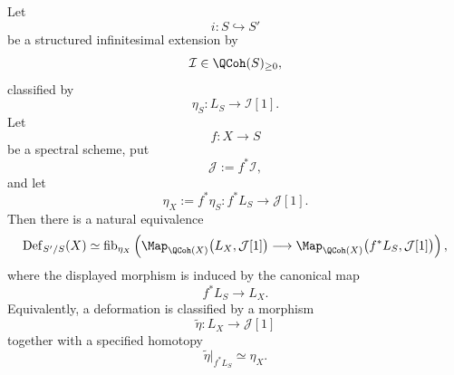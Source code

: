 \begin{lemma}
\label{lem:global-deformation-fixed-topos}
Let
\[
    i
    \colon
    S
    \hookrightarrow
    S'
\]
be a structured infinitesimal extension by
\[
    \mathcal I
    \in
    \QCoh(S)_{\geq0},
\]
classified by
\[
    \eta_S
    \colon
    L_S
    \longrightarrow
    \mathcal I[1].
\]
Let
\[
    f
    \colon
    X
    \longrightarrow
    S
\]
be a spectral scheme, put
\[
    \mathcal J
    :=
    f^*\mathcal I,
\]
and let
\[
    \eta_X
    :=
    f^*\eta_S
    \colon
    f^*L_S
    \longrightarrow
    \mathcal J[1].
\]
Then there is a natural equivalence
\[
    \operatorname{Def}_{S'/S}(X)
    \simeq
    \operatorname{fib}_{\eta_X}
    \left(
        \Map_{\QCoh(X)}
        \bigl(
            L_X,
            \mathcal J[1]
        \bigr)
        \longrightarrow
        \Map_{\QCoh(X)}
        \bigl(
            f^*L_S,
            \mathcal J[1]
        \bigr)
    \right),
\]
where the displayed morphism is induced by the canonical map
\[
    f^*L_S
    \longrightarrow
    L_X.
\]
Equivalently, a deformation is classified by a morphism
\[
    \widetilde\eta
    \colon
    L_X
    \longrightarrow
    \mathcal J[1]
\]
together with a specified homotopy
\[
    \widetilde\eta|_{f^*L_S}
    \simeq
    \eta_X.
\]
\end{lemma}
